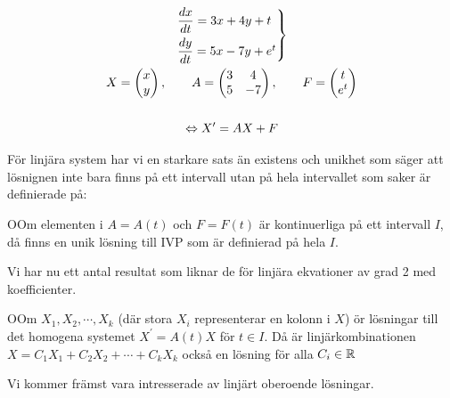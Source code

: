\begin{equation*}
  \begin{gathered}
    \begin{rcases*}
      \dfrac{dx}{dt} = 3x+4y+t\\
      \dfrac{dy}{dt}=5x-7y+e^t
    \end{rcases*}\\
    X = \begin{pmatrix}x\\y\end{pmatrix},\qquad A = \begin{pmatrix}3&4\\5&-7\end{pmatrix},\qquad F = \begin{pmatrix}t\\e^t\end{pmatrix}\\\\
    \Lrarr X^{\prime} = AX+F
  \end{gathered}
\end{equation*}
\par\bigskip
\noindent För linjära system har vi en starkare sats än existens och unikhet som säger att lösnignen inte bara finns på ett intervall utan på hela intervallet som saker är definierade på:
\par\bigskip

\begin{theo}
  OOm elementen i $A=A(t)$ och $F=F(t)$ är kontinuerliga på ett intervall $I$, då finns en unik lösning till IVP som är definierad på hela $I$.
\end{theo}
\par\bigskip
\noindent Vi har nu ett antal resultat som liknar de för linjära ekvationer av grad 2 med koefficienter.
\par\bigskip
\begin{theo}
  OOm $X_1, X_2,\cdots, X_k$ (där stora $X_i$ representerar en kolonn i $X$) ör lösningar till det homogena systemet $X^{\prime} = A(t)X$ för $t\in I$. Då är linjärkombinationen $X = C_1X_1+C_2X_2+\cdots+C_kX_k$ också en lösning för alla $C_i\in\mathbb{R}$
\end{theo}
\par\bigskip
\noindent Vi kommer främst vara intresserade av linjärt oberoende lösningar.
\par\bigskip

